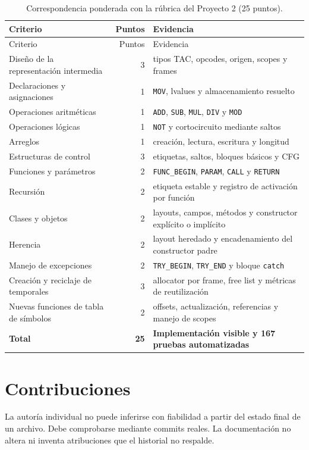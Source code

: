 \documentclass[11pt,letterpaper,oneside]{report}
\newcommand{\codigo}[1]{\texttt{#1}}
\begin{document}
\begin{longtable}{p{}r p{}}
\caption{Correspondencia ponderada con la rúbrica del Proyecto 2 (25 puntos).}
\label{tab:rubric-p2}\\
\toprule
Criterio & Puntos & Evidencia \\
\midrule
\endfirsthead
\toprule
Criterio & Puntos & Evidencia \\
\midrule
\endhead
Diseño de la representación intermedia & 3 & tipos TAC, opcodes, origen, scopes y frames \\
Declaraciones y asignaciones & 1 & \codigo{MOV}, lvalues y almacenamiento resuelto \\
Operaciones aritméticas & 1 & \codigo{ADD}, \codigo{SUB}, \codigo{MUL}, \codigo{DIV} y \codigo{MOD} \\
Operaciones lógicas & 1 & \codigo{NOT} y cortocircuito mediante saltos \\
Arreglos & 1 & creación, lectura, escritura y longitud \\
Estructuras de control & 3 & etiquetas, saltos, bloques básicos y CFG \\
Funciones y parámetros & 2 & \codigo{FUNC\_BEGIN}, \codigo{PARAM}, \codigo{CALL} y \codigo{RETURN} \\
Recursión & 2 & etiqueta estable y registro de activación por función \\
Clases y objetos & 2 & layouts, campos, métodos y constructor explícito o implícito \\
Herencia & 2 & layout heredado y encadenamiento del constructor padre \\
Manejo de excepciones & 2 & \codigo{TRY\_BEGIN}, \codigo{TRY\_END} y bloque \codigo{catch} \\
Creación y reciclaje de temporales & 3 & allocator por frame, free list y métricas de reutilización \\
Nuevas funciones de tabla de símbolos & 2 & offsets, actualización, referencias y manejo de scopes \\
\midrule
\textbf{Total} & \textbf{25} & \textbf{Implementación visible y 167 pruebas automatizadas} \\
\bottomrule
\end{longtable}

\section{Contribuciones}

La autoría individual no puede inferirse con fiabilidad a partir del estado final de
un archivo. Debe comprobarse mediante commits reales. La documentación no altera ni
inventa atribuciones que el historial no respalde.
\end{document}
